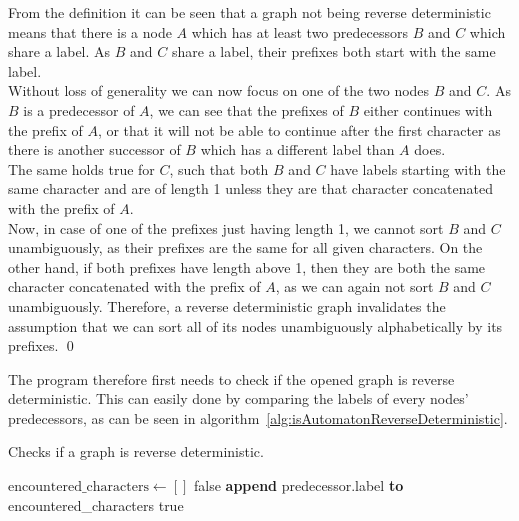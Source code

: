 \documentclass[a4paper,12pt,twoside,BCOR=10mm]{scrbook}
\begin{document}
From the definition it can be seen that a graph not being reverse deterministic means that there 
is a node $ A $ which has at least two predecessors $ B $ and $ C $ which share a label. 
As $ B $ and $ C $ share a label, their prefixes both start with the same label. \\
Without loss of generality we can now focus on one of the two nodes $ B $ and $ C $. 
As $ B $ is a predecessor of $ A $, we can see that the 
prefixes of $ B $ either continues with the prefix of $ A $, 
or that it will not be able to continue after the first character 
as there is another successor of $ B $ which has a different label than $ A $ does. \\
The same holds true for $ C $, such that both $ B $ and $ C $ have labels starting 
with the same character and are of length 1 unless they are that character concatenated 
with the prefix of $ A $. \\
Now, in case of one of the prefixes just having length 1, we cannot sort $ B $ and $ C $ 
unambiguously, as their prefixes are the same for all given characters. 
On the other hand, if both prefixes have length above 1, then they are both 
the same character concatenated with the prefix of $ A $, as we can again not sort $ B $ and $ C $ 
unambiguously. 
Therefore, a reverse deterministic graph invalidates the assumption that we can sort 
all of its nodes unambiguously alphabetically by its prefixes. \qed

The program therefore first needs to check if the opened graph is reverse deterministic. 
This can easily done by comparing the labels of every nodes' predecessors, as can be seen 
in algorithm~\ref{alg:isAutomatonReverseDeterministic}.

\begin{algorithm}
\caption[Check if a graph is reverse deterministic]{Checks if a graph is reverse deterministic.}
\label{alg:isAutomatonReverseDeterministic}
\begin{algorithmic}[1]
	\State $ \textrm{encountered\_characters} \gets [ ] $
			\State \Return false
		\Else
			\State \textbf{append} predecessor.label \textbf{to} encountered\_characters
		\EndIf
	\EndFor
\EndFor
\State \Return true
\end{algorithmic}
\end{algorithm}
\end{document}
